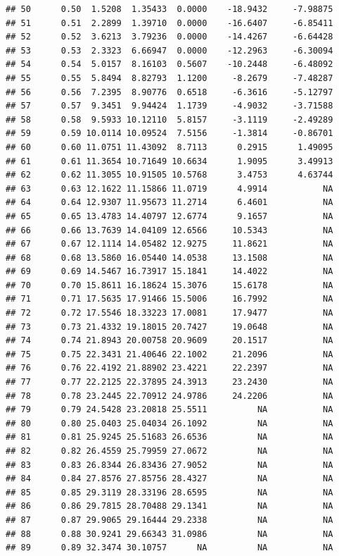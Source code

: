 \documentclass{article}\usepackage[]{graphicx}\usepackage[]{color}
\makeatletter
\newenvironment{kframe}{%
 \def\at@end@of@kframe{}%
 \ifinner\ifhmode%
  \def\at@end@of@kframe{\end{minipage}}%
  \begin{minipage}{\columnwidth}%
 \fi\fi%
 \def\FrameCommand##1{\hskip\@totalleftmargin \hskip-\fboxsep
 \colorbox{shadecolor}{##1}\hskip-\fboxsep
     \hskip-\linewidth \hskip-\@totalleftmargin \hskip\columnwidth}%
 \MakeFramed {\advance\hsize-\width
   \@totalleftmargin\z@ \linewidth\hsize
   \@setminipage}}%
 {\par\unskip\endMakeFramed%
 \at@end@of@kframe}
\newenvironment{knitrout}{}{} %
\makeatother
\begin{document}
\begin{knitrout}
\begin{kframe}
\begin{verbatim}
## 50      0.50  1.5208  1.35433  0.0000    -18.9432     -7.98875
## 51      0.51  2.2899  1.39710  0.0000    -16.6407     -6.85411
## 52      0.52  3.6213  3.79236  0.0000    -14.4267     -6.64428
## 53      0.53  2.3323  6.66947  0.0000    -12.2963     -6.30094
## 54      0.54  5.0157  8.16103  0.5607    -10.2448     -6.48092
## 55      0.55  5.8494  8.82793  1.1200     -8.2679     -7.48287
## 56      0.56  7.2395  8.90776  0.6518     -6.3616     -5.12797
## 57      0.57  9.3451  9.94424  1.1739     -4.9032     -3.71588
## 58      0.58  9.5933 10.12110  5.8157     -3.1119     -2.49289
## 59      0.59 10.0114 10.09524  7.5156     -1.3814     -0.86701
## 60      0.60 11.0751 11.43092  8.7113      0.2915      1.49095
## 61      0.61 11.3654 10.71649 10.6634      1.9095      3.49913
## 62      0.62 11.3055 10.91505 10.5768      3.4753      4.63744
## 63      0.63 12.1622 11.15866 11.0719      4.9914           NA
## 64      0.64 12.9307 11.95673 11.2714      6.4601           NA
## 65      0.65 13.4783 14.40797 12.6774      9.1657           NA
## 66      0.66 13.7639 14.04109 12.6566     10.5343           NA
## 67      0.67 12.1114 14.05482 12.9275     11.8621           NA
## 68      0.68 13.5860 16.05440 14.0538     13.1508           NA
## 69      0.69 14.5467 16.73917 15.1841     14.4022           NA
## 70      0.70 15.8611 16.18624 15.3076     15.6178           NA
## 71      0.71 17.5635 17.91466 15.5006     16.7992           NA
## 72      0.72 17.5546 18.33223 17.0081     17.9477           NA
## 73      0.73 21.4332 19.18015 20.7427     19.0648           NA
## 74      0.74 21.8943 20.00758 20.9609     20.1517           NA
## 75      0.75 22.3431 21.40646 22.1002     21.2096           NA
## 76      0.76 22.4192 21.88902 23.4221     22.2397           NA
## 77      0.77 22.2125 22.37895 24.3913     23.2430           NA
## 78      0.78 23.2445 22.70912 24.9786     24.2206           NA
## 79      0.79 24.5428 23.20818 25.5511          NA           NA
## 80      0.80 25.0403 25.04034 26.1092          NA           NA
## 81      0.81 25.9245 25.51683 26.6536          NA           NA
## 82      0.82 26.4559 25.79959 27.0672          NA           NA
## 83      0.83 26.8344 26.83436 27.9052          NA           NA
## 84      0.84 27.8576 27.85756 28.4327          NA           NA
## 85      0.85 29.3119 28.33196 28.6595          NA           NA
## 86      0.86 29.7815 28.70488 29.1341          NA           NA
## 87      0.87 29.9065 29.16444 29.2338          NA           NA
## 88      0.88 30.9241 29.66343 31.0986          NA           NA
## 89      0.89 32.3474 30.10757      NA          NA           NA

\end{verbatim}
\end{kframe}
\end{knitrout}
\end{document}
